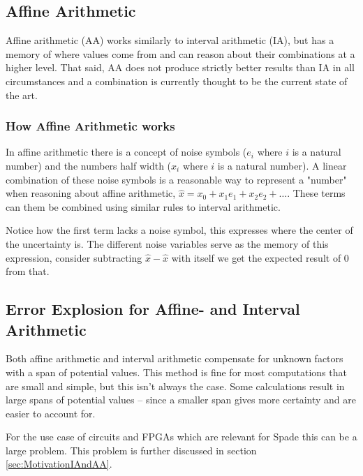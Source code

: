 \subsection{Affine Arithmetic}
Affine arithmetic (AA) works similarly to interval arithmetic (IA), but has a memory of where values come from and can reason about their combinations at a higher level. That said, AA does not produce strictly better results than IA in all circumstances and a combination is currently thought to be the current state of the art. 

\subsubsection{How Affine Arithmetic works}
In affine arithmetic there is a concept of noise symbols ($e_i$ where $i$ is a natural number) and the numbers half width ($x_i$ where $i$ is a natural number). A linear combination of these noise symbols is a reasonable way to represent a "number" when reasoning about affine arithmetic, $\hat{x} = x_0 + x_1e_1 + x_2e_2 + \dots$. These terms can them be combined using similar rules to interval arithmetic.

Notice how the first term lacks a noise symbol, this expresses where the center of the uncertainty is. The different noise variables serve as the memory of this expression, consider subtracting $\hat{x} - \hat{x}$ with itself we get the expected result of 0 from that.


\subsection{Error Explosion for Affine- and Interval Arithmetic}
Both affine arithmetic and interval arithmetic compensate for unknown factors with a span of potential values. This method is fine for most computations that are small and simple, but this isn't always the case. Some calculations result in large spans of potential values -- since a smaller span gives more certainty and are easier to account for.

For the use case of circuits and FPGAs which are relevant for Spade this can be a large problem. This problem is further discussed in section \ref{sec:MotivationIAndAA}.


\cite{src:affAri}

